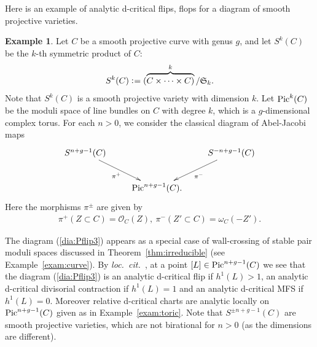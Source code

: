 \documentclass[11pt]{amsart}
\theoremstyle{plain}
\theoremstyle{definition}
\newtheorem{exam}[thm]{Example}
\theoremstyle{remark}
\newcommand{\oO}{\mathcal{O}}
\newcommand{\Pic}{\mathop{\rm Pic}\nolimits}
\begin{document}
Here is an example of analytic d-critical flips, flops 
for a diagram of smooth projective varieties. 
\begin{exam}\label{exam:symC}
Let $C$ be a smooth projective curve with genus $g$, 
and let $S^k(C)$ be the $k$-th symmetric product of $C$:
\begin{align*}
S^k(C) \cneq (\overbrace{C \times \cdots \times C)}^k/\mathfrak{S}_k.
\end{align*}
Note that $S^k(C)$ is a smooth projective variety with dimension $k$. 
Let $\Pic^k(C)$ be the moduli space of line bundles on $C$
with degree $k$, which is a $g$-dimensional complex torus. 
For each $n> 0$, we consider the 
classical diagram of Abel-Jacobi maps
\begin{align}\label{dia:Pflip3}
\xymatrix{
S^{n+g-1}(C)  \ar[rd]_-{\pi^{+}}
 & & 
S^{-n+g-1}(C)
\ar[ld]^-{\pi^{-}} \\
& \Pic^{n+g-1}(C). &
}
\end{align}
Here the morphisms $\pi^{\pm}$ are given by
\begin{align*}
\pi^{+}(Z \subset C)=\oO_C(Z), \ 
\pi^{-}(Z' \subset C)=\omega_C(-Z').
\end{align*}

The diagram (\ref{dia:Pflip3}) appears as a 
special case of wall-crossing of stable pair
moduli spaces discussed in Theorem~\ref{thm:irreducible}
(see Example~\ref{exam:curve}). 
By \textit{loc.~cit.~}, 
at a point $[L] \in \Pic^{n+g-1}(C)$
we see that 
the diagram (\ref{dia:Pflip3}) is 
an analytic d-critical flip if $h^1(L)>1$, an analytic 
d-critical divisorial contraction if $h^1(L)=1$ and 
an analytic d-critical MFS
if $h^1(L)=0$. 
Moreover relative d-critical charts are analytic locally on $\Pic^{n+g-1}(C)$
given as in Example~\ref{exam:toric}. 
Note that $S^{\pm n +g-1}(C)$ are smooth projective 
varieties, which are not birational
for $n>0$ (as the dimensions are different). 
\end{exam}
\end{document}
